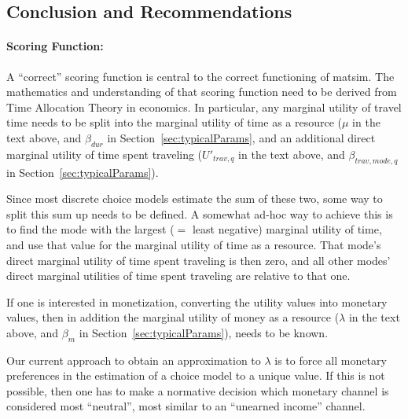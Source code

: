 
\subsection{Conclusion and Recommendations}

\paragraph*{Scoring Function:}

A ``correct'' scoring function is central to the correct functioning of \acrshort{matsim}.
%
The mathematics and understanding of that scoring function need to be derived from Time Allocation Theory in economics.  In particular, any marginal utility of travel time needs to be split into the marginal utility of time as a resource ($\mu$ in the text above, and $\beta_{dur}$ in Section~\ref{sec:typicalParams}, and an additional direct marginal utility of time spent traveling ($U'_{trav,q}$ in the text above, and $\beta_{trav,mode,q}$ in Section~\ref{sec:typicalParams}).

Since most discrete choice models estimate the sum of these two, some way to split this sum up needs to be defined.  A somewhat ad-hoc way to achieve this is to find the mode with the largest ($=$ least negative) marginal utility of time, and use that value for the marginal utility of time as a resource.  That mode's direct marginal utility of time spent traveling is then zero, and all other modes' direct marginal utilities of time spent traveling are relative to that one.

If one is interested in monetization, \ie converting the utility values into monetary values, then in addition the marginal utility of money as a resource ($\lambda$ in the text above, and $\beta_m$ in Section~\ref{sec:typicalParams}), needs to be known. 

Our current approach to obtain an approximation to $\lambda$ is to force all monetary preferences in the estimation of a choice model to a unique value.  If this is not possible, then one has to make a normative decision which monetary channel is considered most ``neutral'', \ie most similar to an ``unearned income'' channel.

